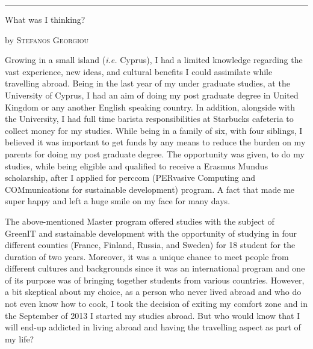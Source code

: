 \documentclass[10pt,a4paper]{article} %
\newcommand{\SepRule}{\noindent	%
\begin{center}
\rule{250pt}{1pt} %
\end{center}
}
\newcommand{\NewsItem}[1]{ %
\usefont{T1}{fvs}{n}{n} %
\vspace{24pt}\large #1\vspace{3pt} %
\par \normalsize \normalfont}
\newcommand{\NewsAuthor}[1]{ %
\hfill by \textsc{#1} \vspace{20pt} %
\par \normalfont}
\begin{document}
\vspace{0.5cm}
\SepRule %
\vspace{0.5cm}

\begin{multicols}{3} %


\NewsItem{What was I thinking?}
\NewsAuthor{Stefanos Georgiou}

Growing in a small island (\textit{i.e.} Cyprus), I had a limited knowledge regarding 
the vast experience, new ideas, and cultural benefits I could assimilate while 
travelling abroad. 
Being in the last year of my under graduate studies, at the University of Cyprus, 
I had an aim of doing my post graduate degree in United Kingdom or any another 
English speaking country. 
In addition, alongside with the University, I had full time barista responsibilities 
at Starbucks cafeteria to collect money for my studies. 
While being in a family of six, with four siblings, I believed it was important 
to get funds by any means to reduce the burden on my parents for doing my post graduate 
degree. 
The opportunity was given, to do my studies, while being eligible and qualified to 
receive a Erasmus Mundus scholarship, after I applied for {\sc perccom} (PERvasive 
Computing and COMmunications for sustainable development) program. 
A fact that made me super happy and left a huge smile on my face for many days.


The above-mentioned Master program offered studies with the subject of GreenIT and 
sustainable development with the opportunity of studying in four different counties 
(France, Finland, Russia, and Sweden) for 18 student for the duration of two years. 
Moreover, it was a unique chance to meet people from different cultures and backgrounds 
since it was an international program and one of its purpose was of bringing together 
students from various countries. 
However, a bit skeptical about my choice, as a person who never lived abroad and 
who do not even know how to cook, I took the decision of exiting my comfort zone 
and in the September of 2013 I started my studies abroad. 
But who would know that I will end-up addicted in living abroad and having the 
travelling aspect as part of my life?



\end{multicols}
\end{document}
